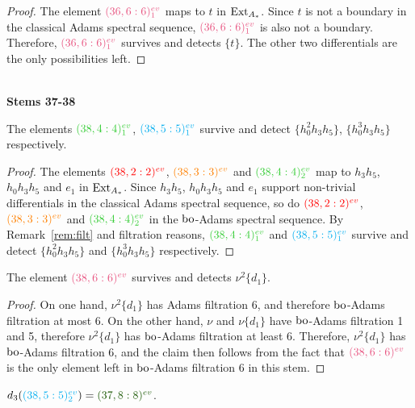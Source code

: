 \begin{proof}
The element $\evrm{36}{6}{lavenderrose}{1}$ maps to $t$ in $\Ex$. Since $t$ is not a boundary in the classical Adams spectral sequence, $\evrm{36}{6}{lavenderrose}{1}$ is also not a boundary. Therefore, $\evrm{36}{6}{lavenderrose}{1}$ survives and detects $\{t\}$. The other two differentials are the only possibilities left.
\end{proof}


\ \\
\noindent
{\bf Stems 37-38}

\noindent

\begin{prop}\label{prop:length38}
The elements $\evrm{38}{4}{limegreen}{1}$, $\evrm{38}{5}{cyan}{1}$ survive and detect $\{h_0^2h_3h_5\}$, $\{h_0^3h_3h_5\}$ respectively.
\end{prop}


\begin{proof}
The elements $\evr{38}{2}{red}$, $\evr{38}{3}{orange}$ and $\evrm{38}{4}{limegreen}{2}$ map to $h_3h_5$, $h_0h_3h_5$ and $e_1$ in $\Ex$. Since $h_3h_5$, $h_0h_3h_5$ and $e_1$ 
support non-trivial
differentials 
in the classical Adams spectral sequence, so do $\evr{38}{2}{red}$, $\evr{38}{3}{orange}$ and $\evrm{38}{4}{limegreen}{2}$
in the $\bo$-Adams spectral sequence. By Remark~\ref{rem:filt} and filtration reasons, $\evrm{38}{4}{limegreen}{1}$ and $\evrm{38}{5}{cyan}{1}$ survive and detect $\{h_0^2h_3h_5\}$ and $\{h_0^3h_3h_5\}$ respectively.
\end{proof}

\begin{prop}
The element $\evr{38}{6}{lavenderrose}$ survives and detects $\nu^2\{d_1\}$.
\end{prop}

\begin{proof}
On one hand, $\nu^2\{d_1\}$ has Adams filtration 6, and therefore $\bo$-Adams filtration at most 6. On the other hand, $\nu$ and $\nu\{d_1\}$ have $\bo$-Adams filtration 1 and 5, therefore $\nu^2\{d_1\}$ has $\bo$-Adams filtration at least 6. Therefore, $\nu^2\{d_1\}$ has $\bo$-Adams filtration 6, and the claim then follows from the fact that $\evr{38}{6}{lavenderrose}$ is the only element left in $\bo$-Adams filtration 6 in this stem.
\end{proof}

\begin{prop}\label{prop:seagreend3}
$d_3(\evrm{38}{5}{cyan}{2}) = \evr{37}{8}{seagreen}$. 
\end{prop}

